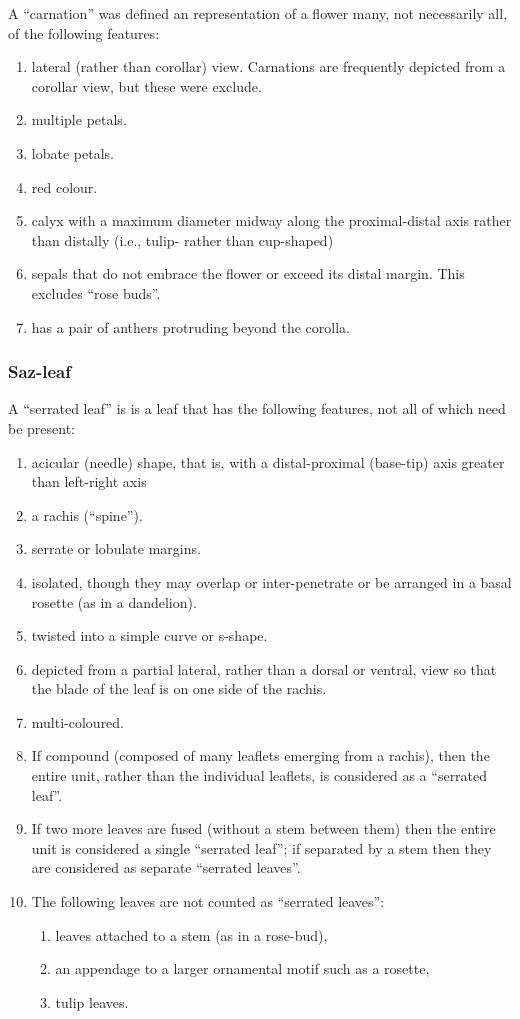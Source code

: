 \documentclass[11pt]{article}
\begin{document}
A ``carnation'' was defined an representation of a flower many, not necessarily all, of the following features:

\begin{enumerate}
\item lateral (rather than corollar) view. Carnations are frequently depicted from a corollar view, but these were exclude.
\item multiple petals.
\item lobate petals.
\item red colour.
\item calyx with a maximum diameter midway along the proximal-distal axis rather than distally (i.e., tulip- rather than cup-shaped)
\item sepals that do not embrace the flower or exceed its distal margin. This excludes ``rose buds''.
\item has a pair of anthers protruding beyond the corolla.
\end{enumerate}
\subsubsection*{Saz-leaf}

A ``serrated leaf'' is is a leaf that has the following features, not all of which need be present:
\begin{enumerate}
\item acicular (needle) shape, that is, with a distal-proximal (base-tip) axis greater than left-right axis
\item a rachis (``spine'').
\item serrate or lobulate margins. 
\item isolated, though they may overlap or inter-penetrate or be arranged in a basal rosette (as in a dandelion). 
\item twisted into a simple curve or s-shape.
\item depicted from a partial lateral, rather than a dorsal or ventral, view so that the blade of the leaf is on one side of the rachis.
\item multi-coloured.
\item If compound (composed of many leaflets emerging from a rachis), then the entire unit, rather than the individual leaflets, is considered as a ``serrated leaf''.
\item If two more leaves are fused (without a stem between them) then the entire unit is considered a single ``serrated leaf''; if separated by a stem then they are considered as separate ``serrated leaves''.
\item The following leaves are not counted as ``serrated leaves'':
\begin{enumerate} 
\item leaves attached to a stem (as in a rose-bud),
 \item an appendage to a larger ornamental motif such as a rosette, 
 \item tulip leaves.
 \end{enumerate}
\end{enumerate} 
\end{document}
